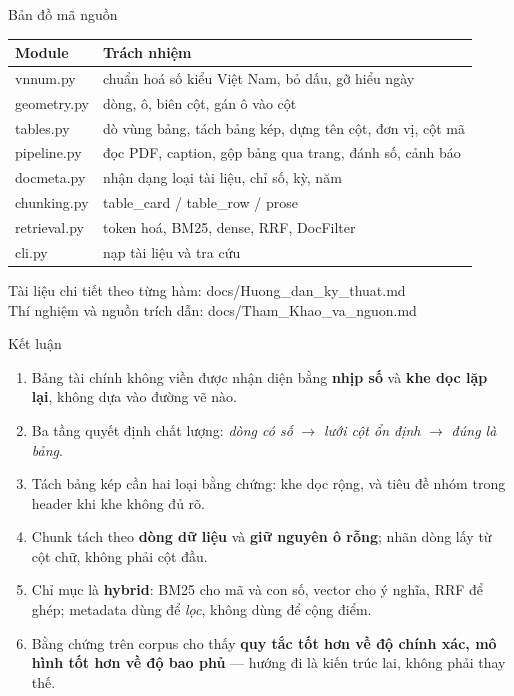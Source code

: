 \documentclass[aspectratio=169,11pt]{beamer}
\newcommand{\src}[1]{{\footnotesize\ttfamily #1}}
\begin{document}
\begin{frame}{Bản đồ mã nguồn}
  \centering
  {\footnotesize
  \begin{tabular}{@{}l l@{}}
    \toprule
    \textbf{Module} & \textbf{Trách nhiệm} \\
    \midrule
    \src{vnnum.py} & chuẩn hoá số kiểu Việt Nam, bỏ dấu, gỡ hiểu ngày \\
    \src{geometry.py} & dòng, ô, biên cột, gán ô vào cột \\
    \src{tables.py} & dò vùng bảng, tách bảng kép, dựng tên cột, đơn vị, cột mã \\
    \src{pipeline.py} & đọc PDF, caption, gộp bảng qua trang, đánh số, cảnh báo \\
    \src{docmeta.py} & nhận dạng loại tài liệu, chỉ số, kỳ, năm \\
    \src{chunking.py} & \src{table\_card} / \src{table\_row} / \src{prose} \\
    \src{retrieval.py} & token hoá, \src{BM25}, dense, \src{RRF}, \src{DocFilter} \\
    \src{cli.py} & nạp tài liệu và tra cứu \\
    \bottomrule
  \end{tabular}}
  \vspace{1.0em}
  {\footnotesize
  Tài liệu chi tiết theo từng hàm: \src{docs/Huong\_dan\_ky\_thuat.md}\\[2pt]
  Thí nghiệm và nguồn trích dẫn: \src{docs/Tham\_Khao\_va\_nguon.md}}
\end{frame}

\begin{frame}{Kết luận}
  \begin{enumerate}
    \item Bảng tài chính không viền được nhận diện bằng \textbf{nhịp số} và
          \textbf{khe dọc lặp lại}, không dựa vào đường vẽ nào.
    \item Ba tầng quyết định chất lượng: \emph{dòng có số} $\rightarrow$
          \emph{lưới cột ổn định} $\rightarrow$ \emph{đúng là bảng}.
    \item Tách bảng kép cần hai loại bằng chứng: khe dọc rộng, và tiêu đề nhóm
          trong header khi khe không đủ rõ.
    \item Chunk tách theo \textbf{dòng dữ liệu} và \textbf{giữ nguyên ô rỗng};
          nhãn dòng lấy từ cột chữ, không phải cột đầu.
    \item Chỉ mục là \textbf{hybrid}: BM25 cho mã và con số, vector cho ý nghĩa,
          RRF để ghép; metadata dùng để \emph{lọc}, không dùng để cộng điểm.
    \item Bằng chứng trên corpus cho thấy \textbf{quy tắc tốt hơn về độ chính xác,
          mô hình tốt hơn về độ bao phủ} --- hướng đi là kiến trúc lai, không phải
          thay thế.
  \end{enumerate}
\end{frame}
\end{document}
